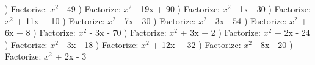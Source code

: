 \documentclass{article}%
\begin{document}
\newline%
) Factorize: $x^2$ - 49%
\newline%
\newline%
) Factorize: $x^2$ - 19x + 90%
\newline%
\newline%
) Factorize: $x^2$ - 1x - 30%
\newline%
\newline%
) Factorize: $x^2$ + 11x + 10%
\newline%
\newline%
) Factorize: $x^2$ - 7x - 30%
\newline%
\newline%
) Factorize: $x^2$ - 3x - 54%
\newline%
\newline%
) Factorize: $x^2$ + 6x + 8%
\newline%
\newline%
) Factorize: $x^2$ - 3x - 70%
\newline%
\newline%
) Factorize: $x^2$ + 3x + 2%
\newline%
\newline%
) Factorize: $x^2$ + 2x - 24%
\newline%
\newline%
) Factorize: $x^2$ - 3x - 18%
\newline%
\newline%
) Factorize: $x^2$ + 12x + 32%
\newline%
\newline%
) Factorize: $x^2$ - 8x - 20%
\newline%
\newline%
) Factorize: $x^2$ + 2x - 3%
\newline%
\newline%
\newline%
\end{document}
